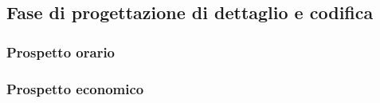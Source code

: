 \subsection{Fase di progettazione di dettaglio e codifica}
	\subsubsection{Prospetto orario}
	\subsubsection{Prospetto economico}
